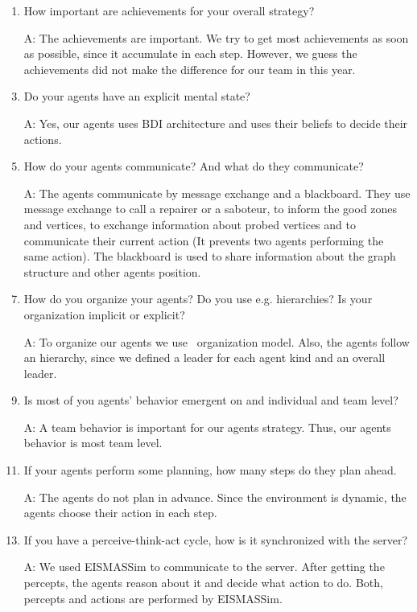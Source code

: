 \begin{enumerate}
\item How important are achievements for your overall strategy?
	\item[A:] The achievements are important. We try to get most achievements as soon as possible, since it accumulate in each step. However, we guess the achievements did not make the difference for our team in this year. \\
	
\item Do your agents have an explicit mental state?
	\item[A:]  Yes, our agents uses BDI architecture and uses their beliefs to decide their actions. \\
	
\item How do your agents communicate? And what do they communicate?
	\item[A:] The agents communicate by message exchange and a blackboard. They use message exchange to call a repairer or a saboteur, to inform the good zones and vertices, to exchange information about probed vertices and to communicate their current action (It prevents two agents performing the same action). The blackboard is used to share information about the graph structure and other agents position.\\
		
\item How do you organize your agents? Do you use e.g. hierarchies? Is your organization implicit or explicit?
	\item[A:] To organize our agents we use \moise\ organization model. Also, the agents follow an hierarchy, since we defined a leader for each agent kind and an overall leader. \\
	
	
\item Is most of you agents' behavior emergent on and individual and team level?
	\item[A:] A team behavior is important for our agents strategy. Thus, our agents behavior is most team level.\\
	
\item If your agents perform some planning, how many steps do they plan ahead.
	\item[A:] The agents do not plan in advance. Since the environment is dynamic, the agents choose their action in each step. \\
	
\item If you have a perceive-think-act cycle, how is it synchronized with the server?
	\item[A:] We used EISMASSim to communicate to the server. After getting the percepts, the agents reason about it and decide what action to do. Both, percepts and actions are performed by EISMASSim. \\
	
	
\end{enumerate}

